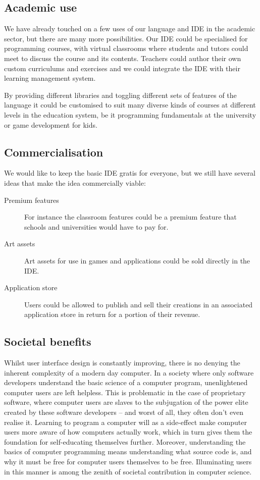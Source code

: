 \subsection{Academic use}

We have already touched on a few uses of our language and IDE in the academic
sector, but there are many more possibilities.
Our IDE could be specialised for programming courses, with virtual classrooms
where students and tutors could meet to discuss the course and its contents.
Teachers could author their own custom curriculums and exercises and we could
integrate the IDE with their learning management system.

By providing different libraries and toggling different sets of features of the
language it could be customised to suit many diverse kinds of courses at
different levels in the education system, be it programming fundamentals at the
university or game development for kids.

\subsection{Commercialisation}

We would like to keep the basic IDE gratis for everyone, but we still have
several ideas that make the idea commercially viable:

\begin{description}
  \item[Premium features]
    For instance the classroom features could be a premium feature that schools
    and universities would have to pay for.
  \item[Art assets]
    Art assets for use in games and applications could be sold directly in the
    IDE.
  \item[Application store]
    Users could be allowed to publish and sell their creations in an 
    associated application store in return for a portion of their revenue.
\end{description}

\subsection{Societal benefits}
Whilst user interface design is constantly improving, there is no denying the 
inherent complexity of a modern day computer. In a society where only software 
developers understand the basic science of a computer program, unenlightened 
computer users are left helpless. This is problematic in the case of 
proprietary software, where computer users are slaves to the subjugation of 
the power elite created by these software developers -- and worst of all, they 
often don't even realise it. Learning to program a computer will as a 
side-effect make computer users more aware of how computers actually work, 
which in turn gives them the foundation for self-educating themselves further. 
Moreover, understanding the basics of computer programming means understanding 
what source code is, and why it must be free for computer users themselves to 
be free. Illuminating users in this manner is among the zenith of societal 
contribution in computer science.

